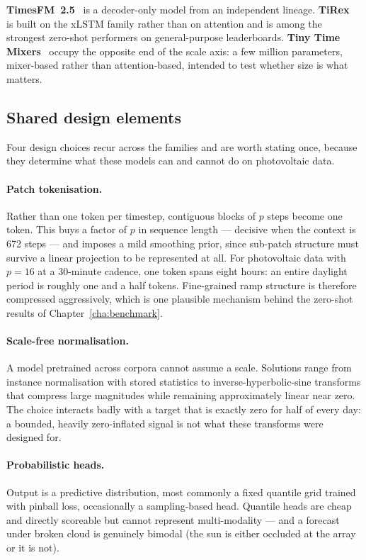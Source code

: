 \textbf{TimesFM~2.5}~\cite{timesfm} is a decoder-only model from an independent lineage.
\textbf{TiRex}~\cite{tirex} is built on the xLSTM family rather than on attention and is
among the strongest zero-shot performers on general-purpose leaderboards. \textbf{Tiny Time
Mixers}~\cite{ttm} occupy the opposite end of the scale axis: a few million parameters,
mixer-based rather than attention-based, intended to test whether size is what matters.

\subsection{Shared design elements}

Four design choices recur across the families and are worth stating once, because they
determine what these models can and cannot do on photovoltaic data.

\paragraph{Patch tokenisation.} Rather than one token per timestep, contiguous blocks of $p$
steps become one token. This buys a factor of $p$ in sequence length --- decisive when the
context is 672 steps --- and imposes a mild smoothing prior, since sub-patch structure must
survive a linear projection to be represented at all. For photovoltaic data with $p=16$ at a
30-minute cadence, one token spans eight hours: an entire daylight period is roughly one and
a half tokens. Fine-grained ramp structure is therefore compressed aggressively, which is one
plausible mechanism behind the zero-shot results of Chapter~\ref{cha:benchmark}.

\paragraph{Scale-free normalisation.} A model pretrained across corpora cannot assume a
scale. Solutions range from instance normalisation with stored statistics to
inverse-hyperbolic-sine transforms that compress large magnitudes while remaining
approximately linear near zero. The choice interacts badly with a target that is exactly zero
for half of every day: a bounded, heavily zero-inflated signal is not what these transforms
were designed for.

\paragraph{Probabilistic heads.} Output is a predictive distribution, most commonly a fixed
quantile grid trained with pinball loss, occasionally a sampling-based head. Quantile heads
are cheap and directly scoreable but cannot represent multi-modality --- and a forecast under
broken cloud is genuinely bimodal (the sun is either occluded at the array or it is not).

